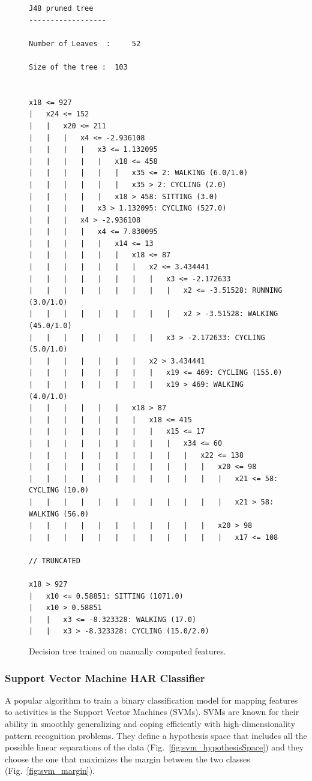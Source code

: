 \begin{figure}[h]
\tiny
\centering
\begin{verbatim}
J48 pruned tree
------------------

Number of Leaves  : 	52

Size of the tree : 	103


x18 <= 927
|   x24 <= 152
|   |   x20 <= 211
|   |   |   x4 <= -2.936108
|   |   |   |   x3 <= 1.132095
|   |   |   |   |   x18 <= 458
|   |   |   |   |   |   x35 <= 2: WALKING (6.0/1.0)
|   |   |   |   |   |   x35 > 2: CYCLING (2.0)
|   |   |   |   |   x18 > 458: SITTING (3.0)
|   |   |   |   x3 > 1.132095: CYCLING (527.0)
|   |   |   x4 > -2.936108
|   |   |   |   x4 <= 7.830095
|   |   |   |   |   x14 <= 13
|   |   |   |   |   |   x18 <= 87
|   |   |   |   |   |   |   x2 <= 3.434441
|   |   |   |   |   |   |   |   x3 <= -2.172633
|   |   |   |   |   |   |   |   |   x2 <= -3.51528: RUNNING (3.0/1.0)
|   |   |   |   |   |   |   |   |   x2 > -3.51528: WALKING (45.0/1.0)
|   |   |   |   |   |   |   |   x3 > -2.172633: CYCLING (5.0/1.0)
|   |   |   |   |   |   |   x2 > 3.434441
|   |   |   |   |   |   |   |   x19 <= 469: CYCLING (155.0)
|   |   |   |   |   |   |   |   x19 > 469: WALKING (4.0/1.0)
|   |   |   |   |   |   x18 > 87
|   |   |   |   |   |   |   x18 <= 415
|   |   |   |   |   |   |   |   x15 <= 17
|   |   |   |   |   |   |   |   |   x34 <= 60
|   |   |   |   |   |   |   |   |   |   x22 <= 138
|   |   |   |   |   |   |   |   |   |   |   x20 <= 98
|   |   |   |   |   |   |   |   |   |   |   |   x21 <= 58: CYCLING (10.0)
|   |   |   |   |   |   |   |   |   |   |   |   x21 > 58: WALKING (56.0)
|   |   |   |   |   |   |   |   |   |   |   x20 > 98
|   |   |   |   |   |   |   |   |   |   |   |   x17 <= 108

// TRUNCATED

x18 > 927
|   x10 <= 0.58851: SITTING (1071.0)
|   x10 > 0.58851
|   |   x3 <= -8.323328: WALKING (17.0)
|   |   x3 > -8.323328: CYCLING (15.0/2.0)
\end{verbatim}
\normalsize
\caption{Decision tree trained on manually computed features.}
\label{fig:dt_example}
\end{figure}

\subsubsection*{{\bf Support Vector Machine HAR Classifier}}
\label{sec:SVM}

A popular algorithm to train a binary classification model for mapping
features to activities is the Support Vector Machines (SVMs). SVMs are
known for their ability in smoothly generalizing and coping
efficiently with high-dimensionality pattern recognition
problems. They define a hypothesis space that includes all the
possible linear separations of the data
(Fig.~\ref{fig:svm_hypothesisSpace}) and they choose the one that
maximizes the margin between the two classes
(Fig.~\ref{fig:svm_margin}).

